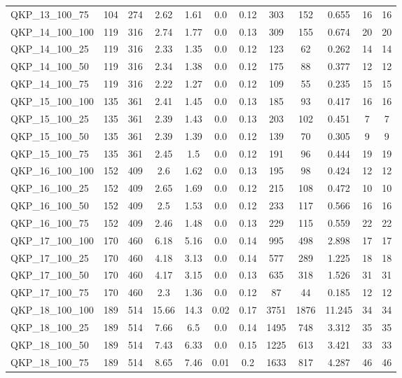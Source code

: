 \begin{table}[!h]
{\begin{tabular}{lccccccccccc}
QKP\_13\_100\_75 & 104 & 274 & 2.62 & 1.61 & 0.0 & 0.12 & 303 & 152 & 0.655 & 16 & 16\\
QKP\_14\_100\_100 & 119 & 316 & 2.74 & 1.77 & 0.0 & 0.13 & 309 & 155 & 0.674 & 20 & 20\\
QKP\_14\_100\_25 & 119 & 316 & 2.33 & 1.35 & 0.0 & 0.12 & 123 & 62 & 0.262 & 14 & 14\\
QKP\_14\_100\_50 & 119 & 316 & 2.34 & 1.38 & 0.0 & 0.12 & 175 & 88 & 0.377 & 12 & 12\\
QKP\_14\_100\_75 & 119 & 316 & 2.22 & 1.27 & 0.0 & 0.12 & 109 & 55 & 0.235 & 15 & 15\\
QKP\_15\_100\_100 & 135 & 361 & 2.41 & 1.45 & 0.0 & 0.13 & 185 & 93 & 0.417 & 16 & 16\\
QKP\_15\_100\_25 & 135 & 361 & 2.39 & 1.43 & 0.0 & 0.13 & 203 & 102 & 0.451 & 7 & 7\\
QKP\_15\_100\_50 & 135 & 361 & 2.39 & 1.39 & 0.0 & 0.12 & 139 & 70 & 0.305 & 9 & 9\\
QKP\_15\_100\_75 & 135 & 361 & 2.45 & 1.5 & 0.0 & 0.12 & 191 & 96 & 0.444 & 19 & 19\\
QKP\_16\_100\_100 & 152 & 409 & 2.6 & 1.62 & 0.0 & 0.13 & 195 & 98 & 0.424 & 12 & 12\\
QKP\_16\_100\_25 & 152 & 409 & 2.65 & 1.69 & 0.0 & 0.12 & 215 & 108 & 0.472 & 10 & 10\\
QKP\_16\_100\_50 & 152 & 409 & 2.5 & 1.53 & 0.0 & 0.12 & 233 & 117 & 0.566 & 16 & 16\\
QKP\_16\_100\_75 & 152 & 409 & 2.46 & 1.48 & 0.0 & 0.13 & 229 & 115 & 0.559 & 22 & 22\\
QKP\_17\_100\_100 & 170 & 460 & 6.18 & 5.16 & 0.0 & 0.14 & 995 & 498 & 2.898 & 17 & 17\\
QKP\_17\_100\_25 & 170 & 460 & 4.18 & 3.13 & 0.0 & 0.14 & 577 & 289 & 1.225 & 18 & 18\\
QKP\_17\_100\_50 & 170 & 460 & 4.17 & 3.15 & 0.0 & 0.13 & 635 & 318 & 1.526 & 31 & 31\\
QKP\_17\_100\_75 & 170 & 460 & 2.3 & 1.36 & 0.0 & 0.12 & 87 & 44 & 0.185 & 12 & 12\\
QKP\_18\_100\_100 & 189 & 514 & 15.66 & 14.3 & 0.02 & 0.17 & 3751 & 1876 & 11.245 & 34 & 34\\
QKP\_18\_100\_25 & 189 & 514 & 7.66 & 6.5 & 0.0 & 0.14 & 1495 & 748 & 3.312 & 35 & 35\\
QKP\_18\_100\_50 & 189 & 514 & 7.43 & 6.33 & 0.0 & 0.15 & 1225 & 613 & 3.421 & 33 & 33\\
QKP\_18\_100\_75 & 189 & 514 & 8.65 & 7.46 & 0.01 & 0.2 & 1633 & 817 & 4.287 & 46 & 46\\

\end{tabular}}
\end{table}
